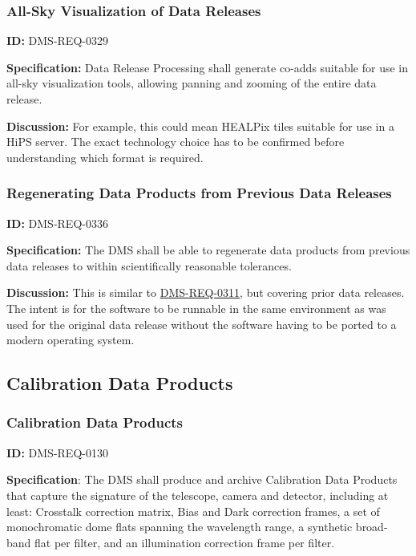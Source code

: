 \documentclass[SE,toc,lsstdraft]{lsstdoc}
\begin{document}
\subsubsection{All-Sky Visualization of Data Releases}

\label{DMS-REQ-0329}
\textbf{ID:} DMS-REQ-0329

\textbf{Specification:} Data Release Processing shall generate co-adds suitable for use in all-sky visualization tools, allowing panning and zooming of the entire data release.

\textbf{Discussion:} For example, this could mean HEALPix tiles suitable for use in a HiPS server. The exact technology choice has to be confirmed before understanding which format is required.




\subsubsection{Regenerating Data Products from Previous Data Releases}

\label{DMS-REQ-0336}
\textbf{ID:} DMS-REQ-0336

\textbf{Specification:} The DMS shall be able to regenerate data products from previous data releases to within scientifically reasonable tolerances.

\textbf{Discussion:} This is similar to \hyperref[DMS-REQ-0311]{DMS-REQ-0311}, but covering prior data releases. The intent is for the software to be runnable in the same environment as was used for the original data release without the software having to be ported to a modern operating system.




\subsection{Calibration Data Products}





\subsubsection{Calibration Data Products}

\label{DMS-REQ-0130}
\textbf{ID:} DMS-REQ-0130

\textbf{Specification}: The DMS shall produce and archive Calibration Data Products that capture the signature of the telescope, camera and detector, including at least: Crosstalk correction matrix, Bias and Dark correction frames, a set of monochromatic dome flats spanning the wavelength range, a synthetic broad-band flat per filter, and an illumination correction frame per filter.
\end{document}
